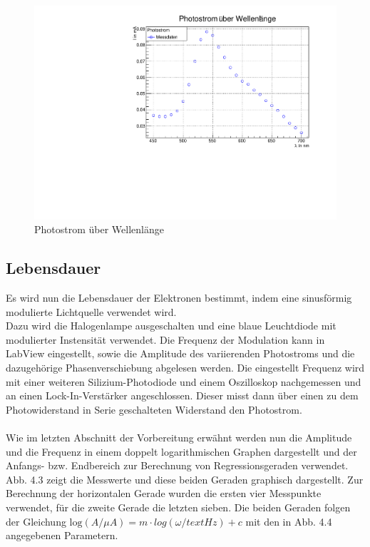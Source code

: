 \begin{figure}
\label{A3}
\centering
\includegraphics[scale=0.5]{../A3/A3.pdf}
\caption{Photostrom über Wellenlänge}
\end{figure}


\FloatBarrier
\subsection{Lebensdauer}

Es wird nun die Lebensdauer der Elektronen bestimmt, indem eine sinusförmig modulierte Lichtquelle verwendet wird. \\
Dazu wird die Halogenlampe ausgeschalten und eine blaue Leuchtdiode mit modulierter Instensität verwendet. Die Frequenz der Modulation kann in LabView eingestellt, sowie die Amplitude des variierenden Photostroms und die dazugehörige Phasenverschiebung abgelesen werden. Die eingestellt Frequenz wird mit einer weiteren Silizium-Photodiode und einem Oszilloskop nachgemessen und an einen Lock-In-Verstärker angeschlossen. Dieser misst dann über einen zu dem Photowiderstand in Serie geschalteten Widerstand den Photostrom. \\
\\
Wie im letzten Abschnitt der Vorbereitung erwähnt werden nun die Amplitude und die Frequenz in einem doppelt logarithmischen Graphen dargestellt und der Anfangs- bzw. Endbereich zur Berechnung von Regressionsgeraden verwendet. \\
Abb. 4.3 zeigt die Messwerte und diese beiden Geraden graphisch dargestellt. Zur Berechnung der horizontalen Gerade wurden die ersten vier Messpunkte verwendet, für die zweite Gerade die letzten sieben. 
Die beiden Geraden folgen der Gleichung $\mathrm{log} (A / \mu A) = m \cdot log(\omega / text{Hz}) + c$ mit den in Abb. 4.4 angegebenen Parametern. \\

